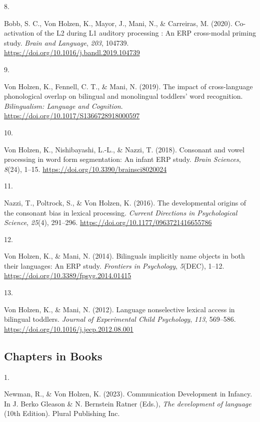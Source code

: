 \documentclass[10pt,a4paper,]{article}
\newlength{\cslhangindent}
\newlength{\csllabelwidth}
\newcommand{\CSLLeftMargin}[1]{\parbox[t]{\csllabelwidth}{\hfill #1~}}
\newcommand{\CSLRightInline}[1]{\parbox[t]{\linewidth - \cslhangindent - \csllabelwidth}{#1}\vspace{0.8ex}}
\begin{document}
\leavevmode{}%
\CSLLeftMargin{8. }%
\CSLRightInline{Bobb, S. C., Von Holzen, K., Mayor, J., Mani, N., \&
Carreiras, M. (2020). Co-activation of the L2 during L1 auditory
processing : An ERP cross-modal priming study. \emph{Brain and
Language}, \emph{203}, 104739.
\url{https://doi.org/10.1016/j.bandl.2019.104739}}

\leavevmode{}%
\CSLLeftMargin{9. }%
\CSLRightInline{Von Holzen, K., Fennell, C. T., \& Mani, N. (2019). The
impact of cross-language phonological overlap on bilingual and
monolingual toddlers' word recognition. \emph{Bilingualism: Language and
Cognition}. \url{https://doi.org/10.1017/S1366728918000597}}

\leavevmode{}%
\CSLLeftMargin{10. }%
\CSLRightInline{Von Holzen, K., Nishibayashi, L.-L., \& Nazzi, T.
(2018). Consonant and vowel processing in word form segmentation: An
infant ERP study. \emph{Brain Sciences}, \emph{8}(24), 1--15.
\url{https://doi.org/10.3390/brainsci8020024}}

\leavevmode{}%
\CSLLeftMargin{11. }%
\CSLRightInline{Nazzi, T., Poltrock, S., \& Von Holzen, K. (2016). The
developmental origins of the consonant bias in lexical processing.
\emph{Current Directions in Psychological Science}, \emph{25}(4),
291--296. \url{https://doi.org/10.1177/0963721416655786}}

\leavevmode{}%
\CSLLeftMargin{12. }%
\CSLRightInline{Von Holzen, K., \& Mani, N. (2014). Bilinguals
implicitly name objects in both their languages: An ERP study.
\emph{Frontiers in Psychology}, \emph{5}(DEC), 1--12.
\url{https://doi.org/10.3389/fpsyg.2014.01415}}

\leavevmode{}%
\CSLLeftMargin{13. }%
\CSLRightInline{Von Holzen, K., \& Mani, N. (2012). Language
nonselective lexical access in bilingual toddlers. \emph{Journal of
Experimental Child Psychology}, \emph{113}, 569--586.
\url{https://doi.org/10.1016/j.jecp.2012.08.001}}

\hypertarget{chapters-in-books}{%
\subsection{Chapters in Books}\label{chapters-in-books}}

\hypertarget{bibliography}{}
\leavevmode{}%
\CSLLeftMargin{1. }%
\CSLRightInline{Newman, R., \& Von Holzen, K. (2023). Communication
Development in Infancy. In J. Berko Gleason \& N. Bernstein Ratner
(Eds.), \emph{The development of language} (10th Edition). Plural
Publishing Inc.}
\end{document}
